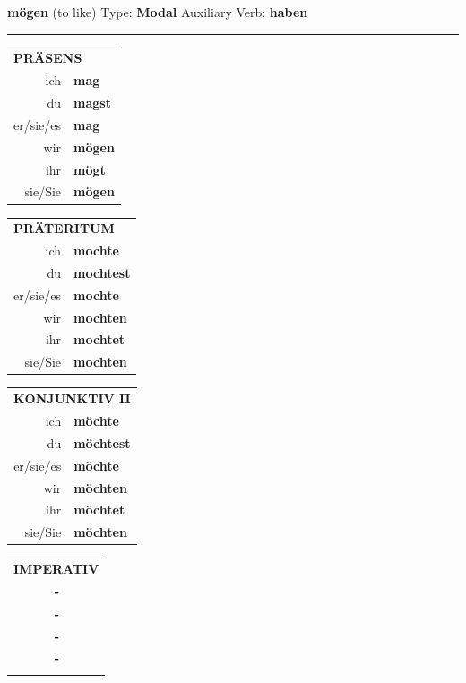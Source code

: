 \documentclass[10pt,a4paper]{revtex4-2}
\begin{document}
\begin{verbbox-modal}
    {\Large \bf mögen} (to like) \hfill Type: \textbf{Modal} \hfill Auxiliary Verb: \textbf{haben} 
     \vspace{5pt}
    \hrule
    \vspace{5pt}
  \begin{tabular}{rl}
     \multicolumn{2}{l}{\textbf{PRÄSENS} }\\
    ich & \textbf{mag}\\
    du & \textbf{magst}\\
    er/sie/es & \textbf{mag}\\
    wir & \textbf{mögen}\\
    ihr & \textbf{mögt}\\
    sie/Sie & \textbf{mögen}\\
  \end{tabular}
  \hfill
     \begin{tabular}{rl}
    \multicolumn{2}{l}{\textbf{PRÄTERITUM} }\\
    ich & \textbf{mochte}\\
    du & \textbf{mochtest}\\
    er/sie/es & \textbf{mochte}\\
    wir & \textbf{mochten}\\
    ihr & \textbf{mochtet}\\
    sie/Sie & \textbf{mochten}\\
  \end{tabular}
    \hfill
     \begin{tabular}{rl}
    \multicolumn{2}{l}{\textbf{KONJUNKTIV II} }\\
    ich & \textbf{möchte}\\
    du & \textbf{möchtest}\\
    er/sie/es & \textbf{möchte}\\
    wir & \textbf{möchten}\\
    ihr & \textbf{möchtet}\\
    sie/Sie & \textbf{möchten}\\
  \end{tabular}
  \hfill
  \begin{tabular}{rl}
     \multicolumn{2}{l}{\textbf{IMPERATIV} }\\
   & \textbf{-}\\
   & \textbf{-}\\
   & \textbf{-}\\
   & \textbf{-}\\
   & \vspace{10pt}
  \end{tabular}


\end{verbbox-modal}
\end{document}
